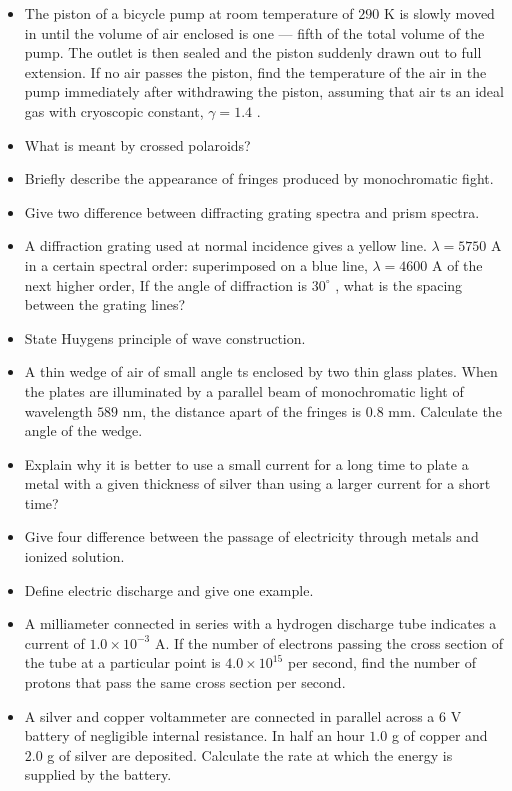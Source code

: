 \documentclass{article}
\begin{document}
\begin{itemize}
\item The piston of a bicycle pump at room temperature of $ 290$ K is slowly moved in until the volume of air enclosed is one — fifth of the total volume of the pump. The outlet is then sealed and the piston suddenly drawn out to full extension. If no air passes the piston, find the temperature of the air in the pump immediately after withdrawing the piston, assuming that air ts an ideal gas with cryoscopic constant, $ \gamma =1.4$ .
\item What is meant by crossed polaroids? 
\item Briefly describe the appearance of fringes produced by monochromatic fight.
\item Give two difference between diffracting grating spectra and prism spectra.
\item A diffraction grating used at normal incidence gives a yellow line. $ \lambda =5750$ A in a certain spectral order: superimposed on a blue line, $ \lambda =4600$ A of the next higher order, If the angle of diffraction is $ 30^{\circ}$ , what is the spacing between the grating lines? 
\item State Huygens principle of wave construction. 
\item A thin wedge of air of small angle ts enclosed by two thin glass plates. When the plates are illuminated by a parallel beam of monochromatic light of wavelength $ 589$ nm, the distance apart of the fringes is $ 0.8$ mm. Calculate the angle of the wedge. 
\item Explain why it is better to use a small current for a long time to plate a metal with a given thickness of silver than using a larger current for a short time? 
\item Give four difference between the passage of electricity through metals and  ionized solution.
\item Define electric discharge and give one example.
\item A milliameter connected in series with a hydrogen discharge tube indicates a current of $ 1.0 \times 10^{-3}$ A. If the number of electrons passing the cross section of the tube at a particular point is $ 4.0 \times 10^{15}$ per second, find the number of protons that pass the same cross section per second. 
\item A silver and copper voltammeter are connected in parallel across a $ 6$ V battery of negligible internal resistance. In half an hour $ 1.0$ g of copper and $ 2.0$ g of silver are deposited. Calculate the rate at which the energy is supplied by the battery. 

\end{itemize}
\end{document}
